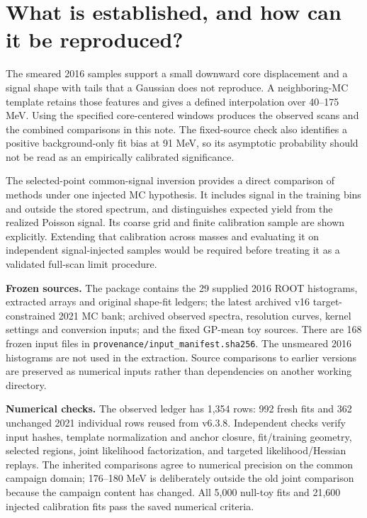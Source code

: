 \documentclass[11pt]{article}
\begin{document}
\clearpage\section*{What is established, and how can it be reproduced?}

The smeared 2016 samples support a small downward core displacement and a signal shape with tails that a Gaussian does not reproduce. A neighboring-MC template retains those features and gives a defined interpolation over 40--175 MeV. Using the specified core-centered windows produces the observed scans and the combined comparisons in this note. The fixed-source check also identifies a positive background-only fit bias at 91 MeV, so its asymptotic probability should not be read as an empirically calibrated significance.

The selected-point common-signal inversion provides a direct comparison of methods under one injected MC hypothesis. It includes signal in the training bins and outside the stored spectrum, and distinguishes expected yield from the realized Poisson signal. Its coarse grid and finite calibration sample are shown explicitly. Extending that calibration across masses and evaluating it on independent signal-injected samples would be required before treating it as a validated full-scan limit procedure.

\textbf{Frozen sources.} The package contains the 29 supplied 2016 ROOT histograms, extracted arrays and original shape-fit ledgers; the latest archived v16 target-constrained 2021 MC bank; archived observed spectra, resolution curves, kernel settings and conversion inputs; and the fixed GP-mean toy sources. There are 168 frozen input files in \texttt{provenance/input\_manifest.sha256}. The unsmeared 2016 histograms are not used in the extraction. Source comparisons to earlier versions are preserved as numerical inputs rather than dependencies on another working directory.

\textbf{Numerical checks.} The observed ledger has 1,354 rows: 992 fresh fits and 362 unchanged 2021 individual rows reused from v6.3.8. Independent checks verify input hashes, template normalization and anchor closure, fit/training geometry, selected regions, joint likelihood factorization, and targeted likelihood/Hessian replays. The inherited comparisons agree to numerical precision on the common campaign domain; 176--180 MeV is deliberately outside the old joint comparison because the campaign content has changed. All 5,000 null-toy fits and 21,600 injected calibration fits pass the saved numerical criteria.
\end{document}
